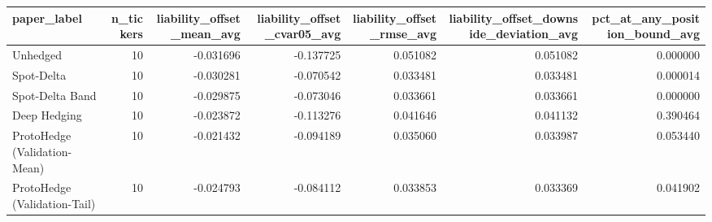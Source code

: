 \begin{tabular}{lrrrrrr}
\toprule
paper\_label & n\_tickers & liability\_offset\_mean\_avg & liability\_offset\_cvar05\_avg & liability\_offset\_rmse\_avg & liability\_offset\_downside\_deviation\_avg & pct\_at\_any\_position\_bound\_avg \\
\midrule
Unhedged & 10 & -0.031696 & -0.137725 & 0.051082 & 0.051082 & 0.000000 \\
Spot-Delta & 10 & -0.030281 & -0.070542 & 0.033481 & 0.033481 & 0.000014 \\
Spot-Delta Band & 10 & -0.029875 & -0.073046 & 0.033661 & 0.033661 & 0.000000 \\
Deep Hedging & 10 & -0.023872 & -0.113276 & 0.041646 & 0.041132 & 0.390464 \\
ProtoHedge (Validation-Mean) & 10 & -0.021432 & -0.094189 & 0.035060 & 0.033987 & 0.053440 \\
ProtoHedge (Validation-Tail) & 10 & -0.024793 & -0.084112 & 0.033853 & 0.033369 & 0.041902 \\
\bottomrule
\end{tabular}
